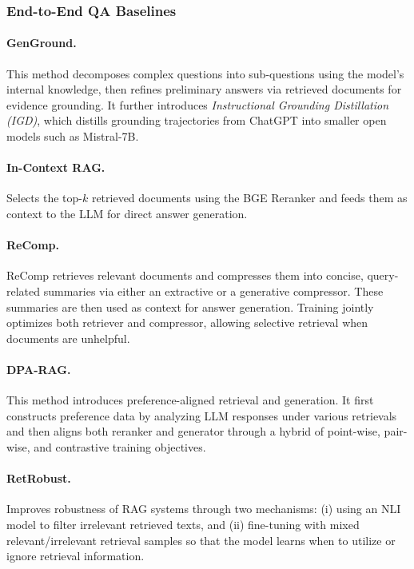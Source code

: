 \documentclass{applemlr}
\numberwithin{equation}{section}
\begin{document}
\subsubsection{End-to-End QA Baselines}

\paragraph{GenGround. \citep{shi-etal-2024-generate}}
This method decomposes complex questions into sub-questions 
using the model’s internal knowledge, 
then refines preliminary answers via retrieved documents for evidence grounding. 
It further introduces \textit{Instructional Grounding Distillation (IGD)}, 
which distills grounding trajectories from ChatGPT into smaller open models such as Mistral-7B.

\paragraph{In-Context RAG.}
Selects the top-$k$ retrieved documents using the BGE Reranker 
and feeds them as context to the LLM for direct answer generation.

\paragraph{ReComp. \citep{xu2024recomp}}
ReComp retrieves relevant documents and compresses them into concise, query-related summaries 
via either an extractive or a generative compressor. 
These summaries are then used as context for answer generation. 
Training jointly optimizes both retriever and compressor, 
allowing selective retrieval when documents are unhelpful.

\paragraph{DPA-RAG. \citep{dong2025understand}}
This method introduces preference-aligned retrieval and generation. 
It first constructs preference data by analyzing LLM responses under various retrievals 
and then aligns both reranker and generator 
through a hybrid of point-wise, pair-wise, and contrastive training objectives.

\paragraph{RetRobust. \citep{yoran2024making}}
Improves robustness of RAG systems through two mechanisms: 
(i) using an NLI model to filter irrelevant retrieved texts, 
and (ii) fine-tuning with mixed relevant/irrelevant retrieval samples 
so that the model learns when to utilize or ignore retrieval information.
\end{document}
